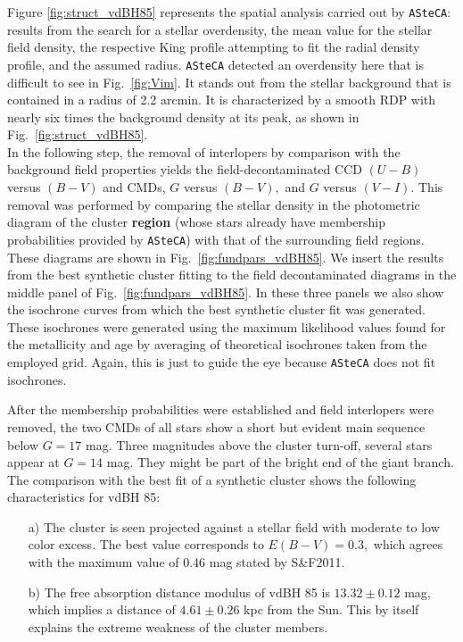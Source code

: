\documentclass[draft]{aa}
\begin{document}
Figure \ref{fig:struct_vdBH85} represents the spatial analysis carried
out by \texttt{ASteCA}: results from the search for a stellar
overdensity, the mean value for the stellar field density, the respective King
profile attempting to fit the radial density profile, and the assumed radius.
%
\texttt{ASteCA} detected an overdensity here that is difficult to see in
Fig.~\ref{fig:Vim}. It stands out from the stellar background that is contained
in a radius of 2.2 arcmin. It is characterized by a smooth RDP 
with nearly six times the background density at its peak, 
as shown in Fig.~\ref{fig:struct_vdBH85}.\\

In the following step, the removal of interlopers by comparison with the
background field properties yields the field-decontaminated CCD
$(U-B)$ versus $(B-V)$ and CMDs, $G$ versus $(B-V),$ and $G$ versus $(V-I)$.
This removal was performed by comparing the stellar density in the photometric
diagram of the cluster \textbf{region} (whose stars already have membership
probabilities provided by \texttt{ASteCA}) with that of the surrounding field
regions. These diagrams are shown in Fig.~\ref{fig:fundpars_vdBH85}.
%
We insert the results from the best synthetic cluster fitting to the field
decontaminated diagrams in the middle panel of Fig.~\ref{fig:fundpars_vdBH85}.
In these three panels we also show the isochrone curves from which the best
synthetic cluster fit was generated. These isochrones were generated
using the maximum likelihood values found for the metallicity and age by
averaging of theoretical isochrones taken from the employed grid.
Again, this is just to guide the eye because \texttt{ASteCA} does not fit
isochrones.

After the membership probabilities were established and field
interlopers were removed, the two CMDs of all stars show a short but evident main
sequence below $G=17$ mag.
Three magnitudes above the cluster turn-off, several stars appear at $G=14$ mag. They might be part of the bright end of the giant branch. The comparison
with the best fit of a synthetic cluster shows the following
characteristics for vdBH 85:

\begin{itemize}
\item [a)] The cluster is seen projected against a stellar field with moderate
    to low color excess. The best value corresponds to $E(B-V)=0.3,$ which
    agrees with the maximum value of 0.46 mag stated by S\&F2011.
\item [b)] The free absorption distance modulus of vdBH 85 is
    $13.32\pm0.12$ mag, which implies a distance of $4.61\pm0.26$ kpc
    from the Sun.  This by itself explains the extreme weakness of the
    cluster members.
\end{itemize}
\end{document}
